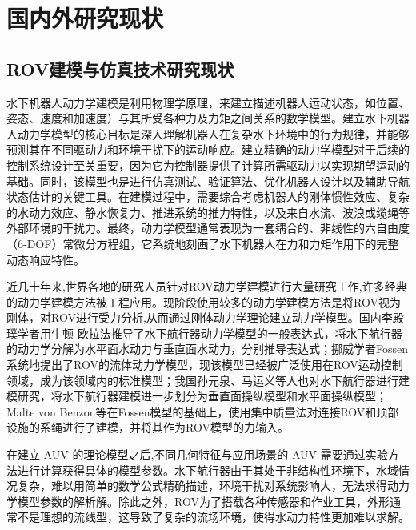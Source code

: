 \section{国内外研究现状}
\subsection{ROV建模与仿真技术研究现状}
水下机器人动力学建模是利用物理学原理，来建立描述机器人运动状态，如位置、姿态、速度和加速度）与其所受各种力及力矩之间关系的数学模型。建立水下机器人动力学模型的核心目标是深入理解机器人在复杂水下环境中的行为规律，并能够预测其在不同驱动力和环境干扰下的运动响应。建立精确的动力学模型对于后续的控制系统设计至关重要，因为它为控制器提供了计算所需驱动力以实现期望运动的基础。同时，该模型也是进行仿真测试、验证算法、优化机器人设计以及辅助导航状态估计的关键工具。在建模过程中，需要综合考虑机器人的刚体惯性效应、复杂的水动力效应、静水恢复力、推进系统的推力特性，以及来自水流、波浪或缆绳等外部环境的干扰力。最终，动力学模型通常表现为一套耦合的、非线性的六自由度（6-DOF）常微分方程组，它系统地刻画了水下机器人在力和力矩作用下的完整动态响应特性。

近几十年来,世界各地的研究人员针对ROV动力学建模进行大量研究工作,许多经典的动力学建模方法被工程应用。现阶段使用较多的动力学建模方法是将ROV视为刚体，对ROV进行受力分析,从而通过刚体动力学理论建立动力学模型。国内李殿璞学者\cite{LiDianPuChuanBoYunDongYuJianMo2008}用牛顿-欧拉法推导了水下航行器动力学模型的一般表达式，将水下航行器的动力学分解为水平面水动力与垂直面水动力，分别推导表达式；挪威学者Fossen系统地提出了ROV的流体动力学模型\cite{fossenHandbookMarineCraft2021}，现该模型已经被广泛使用在ROV运动控制领域，成为该领域内的标准模型；我国孙元泉、马运义等人\cite{2001潜艇和深潜器的现代操纵理论与应用}也对水下航行器进行建模研究，将水下航行器建模进一步划分为垂直面操纵模型和水平面操纵模型；Malte von Benzon等\cite{vonbenzonOpenSourceBenchmarkSimulator2022}在Fossen模型的基础上，使用集中质量法对连接ROV和顶部设施的系绳进行了建模，并将其作为ROV模型的力输入。

在建立 AUV 的理论模型之后,不同几何特征与应用场景的 AUV 需要通过实验方法进行计算获得具体的模型参数。水下航行器由于其处于非结构性环境下，水域情况复杂，难以用简单的数学公式精确描述，环境干扰对系统影响大，无法求得动力学模型参数的解析解。除此之外，ROV为了搭载各种传感器和作业工具，外形通常不是理想的流线型，这导致了复杂的流场环境，使得水动力特性更加难以求解。

